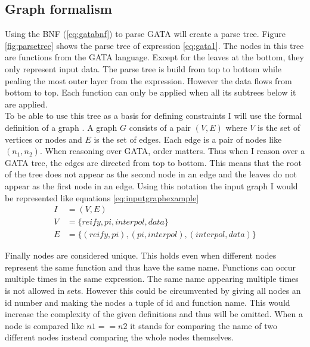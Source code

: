 \documentclass{article}
\begin{document}
\subsection{Graph formalism}
Using the BNF (\ref{eq:gatabnf}) to parse GATA will create a parse tree. Figure \ref{fig:parsetree} shows the parse tree of expression \ref{eq:gata1}. The nodes in this tree are functions from the GATA language. Except for the leaves at the bottom, they only represent input data. The parse tree is build from top to bottom while pealing the most outer layer from the expression. However the data flows from bottom to top. Each function can only be applied when all its subtrees below it are applied. 
\\

To be able to use this tree as a basis for defining constraints I will use the formal definition of a graph \cite{trudeau2013introduction}.  A graph $G$ consists of a pair $(V,E)$ where $V$ is the set of vertices or nodes and $E$ is the set of edges. Each edge is a pair of nodes like $(n_1, n_2)$. When reasoning over GATA, order matters. Thus when I reason over a GATA tree, the edges are directed from top to bottom. This means that the root of the tree does not appear as the second node in an edge and the leaves do not appear as the first node in an edge. 
Using this notation the input graph I would be represented like equations \ref{eq:inputgraphexample}
 \begin{align}
     I &= (V,E) \nonumber \\
     V &= \{reify,pi,interpol, data\} \nonumber \\
     E &= \{(reify,pi), (pi,interpol), (interpol,data)\} \label{eq:inputgraphexample}
 \end{align}
 
 Finally nodes are considered unique. This holds even when different nodes represent the same function and thus have the same name. Functions can occur multiple times in the same expression. The same name appearing multiple times is not allowed in sets. However this could be circumvented by giving all nodes an id number and making the nodes a tuple of id and function name. This would increase the complexity of the given definitions and thus will be omitted. When a node is compared like $n1 == n2$ it stands for comparing the name of two different nodes instead comparing the whole nodes themselves. 
 
 
 
\\ %
\end{document}
